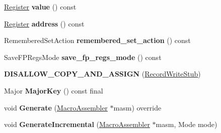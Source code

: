 \begin{DoxyCompactItemize}
\item 
\hyperlink{structv8_1_1internal_1_1_register}{Register} {\bfseries value} () const \hypertarget{classv8_1_1internal_1_1_record_write_stub_a7c90bc874fcf5f031f8b923b09dee7ad}{}\label{classv8_1_1internal_1_1_record_write_stub_a7c90bc874fcf5f031f8b923b09dee7ad}

\item 
\hyperlink{structv8_1_1internal_1_1_register}{Register} {\bfseries address} () const \hypertarget{classv8_1_1internal_1_1_record_write_stub_a3735e76e5fcb078fcd9f08c519c94d8c}{}\label{classv8_1_1internal_1_1_record_write_stub_a3735e76e5fcb078fcd9f08c519c94d8c}

\item 
Remembered\+Set\+Action {\bfseries remembered\+\_\+set\+\_\+action} () const \hypertarget{classv8_1_1internal_1_1_record_write_stub_ab333b01d325ff4e597af83c7f93bc109}{}\label{classv8_1_1internal_1_1_record_write_stub_ab333b01d325ff4e597af83c7f93bc109}

\item 
Save\+F\+P\+Regs\+Mode {\bfseries save\+\_\+fp\+\_\+regs\+\_\+mode} () const \hypertarget{classv8_1_1internal_1_1_record_write_stub_a958cf062d6f62adc812d2df9b92bd24a}{}\label{classv8_1_1internal_1_1_record_write_stub_a958cf062d6f62adc812d2df9b92bd24a}

\item 
{\bfseries D\+I\+S\+A\+L\+L\+O\+W\+\_\+\+C\+O\+P\+Y\+\_\+\+A\+N\+D\+\_\+\+A\+S\+S\+I\+GN} (\hyperlink{classv8_1_1internal_1_1_record_write_stub}{Record\+Write\+Stub})\hypertarget{classv8_1_1internal_1_1_record_write_stub_ab5fe793d232d0a1fea1b3626df883dd3}{}\label{classv8_1_1internal_1_1_record_write_stub_ab5fe793d232d0a1fea1b3626df883dd3}

\item 
Major {\bfseries Major\+Key} () const  final\hypertarget{classv8_1_1internal_1_1_record_write_stub_aa48ea86c84fbc9af6c238be1b4b8fa8d}{}\label{classv8_1_1internal_1_1_record_write_stub_aa48ea86c84fbc9af6c238be1b4b8fa8d}

\item 
void {\bfseries Generate} (\hyperlink{classv8_1_1internal_1_1_macro_assembler}{Macro\+Assembler} $\ast$masm) override\hypertarget{classv8_1_1internal_1_1_record_write_stub_a71cb55552be288a12876045441a66dca}{}\label{classv8_1_1internal_1_1_record_write_stub_a71cb55552be288a12876045441a66dca}

\item 
void {\bfseries Generate\+Incremental} (\hyperlink{classv8_1_1internal_1_1_macro_assembler}{Macro\+Assembler} $\ast$masm, Mode mode)\hypertarget{classv8_1_1internal_1_1_record_write_stub_a05cf08ed0350334ba02a2e918b42ffcc}{}\label{classv8_1_1internal_1_1_record_write_stub_a05cf08ed0350334ba02a2e918b42ffcc}


\end{DoxyCompactItemize}
